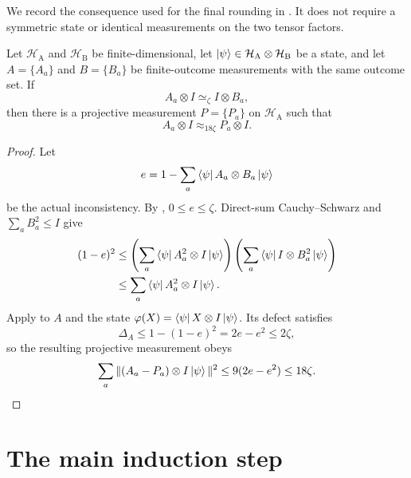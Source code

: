 \documentclass[11pt]{article}
\theoremstyle{definition}
\newcommand{\ot}{\otimes}
\newcommand{\calH}{\mathcal{H}}
\begin{document}
We record the consequence used for the final rounding in
.  It does not require a symmetric state or
identical measurements on the two tensor factors.

\begin{lemma}
\label{lem:orthonormalization-main-lemma}
Let $\calH_{\mathrm A}$ and $\calH_{\mathrm B}$ be finite-dimensional,
let $\ket\psi\in\calH_{\mathrm A}\ot\calH_{\mathrm B}$ be a state, and
let $A=\{A_a\}$ and $B=\{B_a\}$ be finite-outcome measurements with the
same outcome set.  If
\begin{equation*}
 A_a\ot I\simeq_\zeta I\ot B_a,
\end{equation*}
then there is a projective measurement $P=\{P_a\}$ on
$\calH_{\mathrm A}$ such that
\begin{equation}\label{eq:consistent-measurement-orthogonalization}
 A_a\ot I\approx_{18\zeta}P_a\ot I.
\end{equation}
\end{lemma}

\begin{proof}
Let
\begin{equation*}
 e=1-\sum_a\bra\psi A_a\ot B_a\ket\psi
\end{equation*}
be the actual inconsistency.  By
, $0\leq e\leq\zeta$.  Direct-sum
Cauchy--Schwarz and $\sum_aB_a^2\leq I$ give
\begin{align*}
 (1-e)^2
 &\leq
 \left(\sum_a\bra\psi A_a^2\ot I\ket\psi\right)
 \left(\sum_a\bra\psi I\ot B_a^2\ket\psi\right)\\
 &\leq\sum_a\bra\psi A_a^2\ot I\ket\psi.
\end{align*}
Apply  to $A$ and the state
$\varphi(X)=\bra\psi X\ot I\ket\psi$.  Its defect satisfies
\begin{equation*}
 \Delta_A\leq1-(1-e)^2=2e-e^2\leq2\zeta,
\end{equation*}
so the resulting projective measurement obeys
\begin{equation*}
 \sum_a\|(A_a-P_a)\ot I\ket\psi\|^2
 \leq9(2e-e^2)\leq18\zeta.
\end{equation*}
\end{proof}

\section{The main induction step}
\label{sec:induction}
\end{document}
